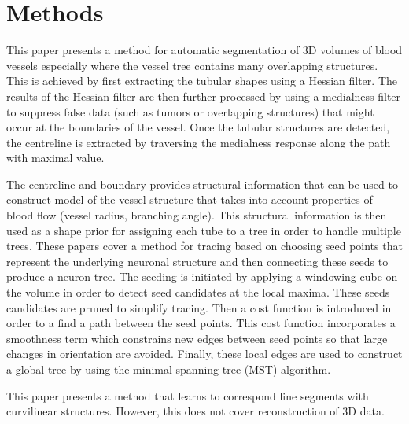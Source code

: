 \documentclass[12pt]{article}
\begin{document}
\section{Methods}

\begin{enumerate}[label={}]
			This paper presents a method for
			automatic segmentation of 3D volumes of blood
			vessels especially where the vessel tree
			contains many overlapping structures. This
			is achieved by first extracting the
			tubular shapes using a Hessian filter. The
			results of the Hessian filter are then
			further processed by using a medialness filter
			to suppress false data (such as tumors or
			overlapping structures) that might occur at
			the boundaries of the vessel. Once the
			tubular structures are detected, the
			centreline is extracted by traversing the
			medialness response along the path with
			maximal value.

			The centreline and boundary provides structural
			information that can be used to construct
			model of the vessel structure that takes
			into account properties of blood flow
			(vessel radius, branching angle). This
			structural information is then used as
			a shape prior for assigning each tube to a
			tree in order to handle multiple
			trees.
			These papers cover a method for tracing
			based on choosing seed points that
			represent the underlying neuronal
			structure and then connecting these seeds
			to produce a neuron tree. The seeding is
			initiated by applying a windowing cube on
			the volume in order to detect seed
			candidates at the local maxima. These
			seeds candidates are pruned to simplify
			tracing. Then a cost function is
			introduced in order to a find a path
			between the seed points. This cost
			function incorporates a smoothness term
			which constrains new edges between seed
			points so that large changes in
			orientation are avoided. Finally, these
			local edges are used to construct a
			global tree by using the
			minimal-spanning-tree (MST) algorithm.

			This paper presents a method that learns
			to correspond line segments with
			curvilinear structures. However, this does
			not cover reconstruction of 3D data.


\end{enumerate}
\end{document}

